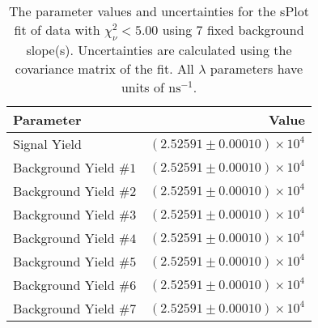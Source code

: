 
\begin{table}
    \begin{center}
        \begin{tabular}{lr}\toprule
            Parameter & Value \\\midrule
            Signal Yield & $(2.52591 \pm 0.00010) \times 10^{4}$ \\
            Background Yield $\#1$ & $(2.52591 \pm 0.00010) \times 10^{4}$ \\
            Background Yield $\#2$ & $(2.52591 \pm 0.00010) \times 10^{4}$ \\
            Background Yield $\#3$ & $(2.52591 \pm 0.00010) \times 10^{4}$ \\
            Background Yield $\#4$ & $(2.52591 \pm 0.00010) \times 10^{4}$ \\
            Background Yield $\#5$ & $(2.52591 \pm 0.00010) \times 10^{4}$ \\
            Background Yield $\#6$ & $(2.52591 \pm 0.00010) \times 10^{4}$ \\
            Background Yield $\#7$ & $(2.52591 \pm 0.00010) \times 10^{4}$ \\\bottomrule
        \end{tabular}
        \caption{The parameter values and uncertainties for the sPlot fit of data with $\chi^2_\nu < 5.00$ using 7 fixed background slope(s). Uncertainties are calculated using the covariance matrix of the fit. All $\lambda$ parameters have units of $\si{\nano\second}^{-1}$.}
    \end{center}
\end{table}

